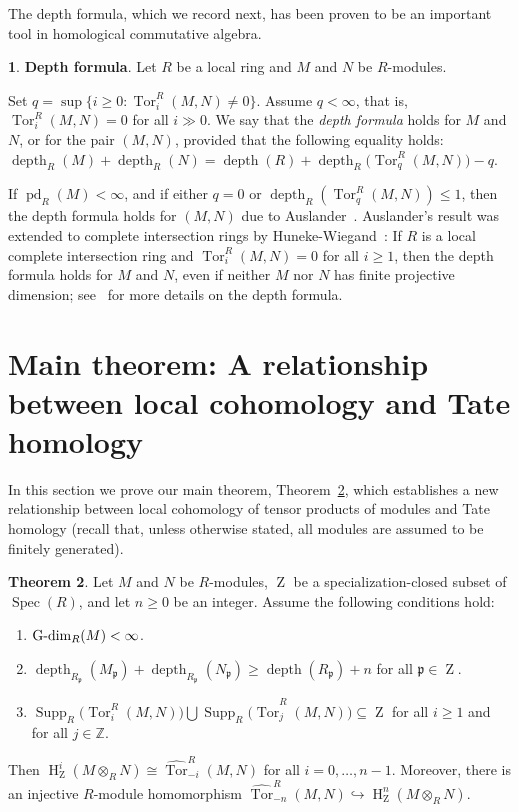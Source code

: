 \documentclass[11pt]{amsart}
\theoremstyle{definition}
\newtheorem{thm}{Theorem}[section]
\theoremstyle{definition}
\newtheorem{chunk}[thm]{\hspace*{-1.065ex}\bf}
\numberwithin{equation}{section}
\newcommand{\fp}{\mathfrak{p}}
\newcommand{\ZZ}{\mathbb{Z}}
\DeclareMathOperator{\Gdim}{\textnormal{G-dim}}
\DeclareMathOperator{\mz}{Z}
\DeclareMathOperator{\depth}{depth}
\DeclareMathOperator{\hh}{H}
\DeclareMathOperator{\pd}{pd}
\DeclareMathOperator{\Supp}{Supp}
\DeclareMathOperator{\Spec}{Spec}
\DeclareMathOperator{\Tor}{Tor}
\begin{document}
The depth formula, which we record next, has been proven to be an important tool in homological commutative algebra. 

\begin{chunk} \textbf{Depth formula}. \label{df} Let $R$ be a local ring and $M$ and $N$ be $R$-modules. 

Set $q=\sup\{i\geq 0: \Tor_i^R(M,N)\neq 0\}$. Assume $q<\infty$, that is,  $\Tor_i^R(M,N)=0$ for all $i\gg 0$. We say that the \emph{depth formula} holds for $M$ and $N$, or for the pair $(M,N)$, provided that the following equality holds:
$\depth_R(M)+\depth_R(N)=\depth(R)+\depth_R\big(\Tor_q^R(M,N)\big)-q$.

If $\pd_R(M)<\infty$, and if either $q=0$ or $\depth_R\left(\Tor_q^R(M,N)\right)\leq 1$, then the depth formula holds for $(M,N)$ due to Auslander~\cite[1.2]{Au}. Auslander's result was extended to complete intersection rings by Huneke-Wiegand~\cite[2.5]{HW1}: If $R$ is a local complete intersection ring and $\Tor_i^R(M,N)=0$ for all $i\geq 1$, then the depth formula holds for $M$ and $N$, even if neither $M$ nor $N$ has finite projective dimension; see~\cite{CJ} for more details on the depth formula.
\end{chunk}


\section{Main theorem: A relationship between local cohomology and Tate homology}\label{mainsection}

In this section we prove our main theorem, Theorem~\ref{t12}, which establishes a new relationship between local cohomology of tensor products of modules and Tate homology (recall that, unless otherwise stated, all modules are assumed to be finitely generated).

\begin{thm}\label{t12} Let $M$ and $N$ be $R$-modules, $\mz$ be a specialization-closed subset of $\Spec(R)$, and let $n\geq 0$ be an integer. Assume the following conditions hold:
\begin{enumerate}[\rm(i)]
\item $\Gdim_R(M)<\infty$.
\item $\depth_{R_\fp}(M_\fp)+\depth_{R_\fp}(N_\fp)\geq\depth(R_{\fp})+n$ for all $\fp\in\mz$.
\item $\Supp_R\big(\Tor_i^R(M,N)\big) \bigcup \Supp_R\Big(\widehat{\Tor}_j^R(M,N)\Big) \subseteq\mz$ for all $i\geq 1$ and for all $j\in\ZZ$.
\end{enumerate}
Then $\hh^i_{\mz}(M\otimes_RN)\cong\widehat{\Tor}_{-i}^R(M,N)$ for all $i=0, \ldots, n-1$. Moreover, there is an injective $R$-module homomorphism $\widehat{\Tor}_{-n}^R(M,N)\hookrightarrow\hh^n_{\mz}(M\otimes_RN)$.
\end{thm}
\end{document}
